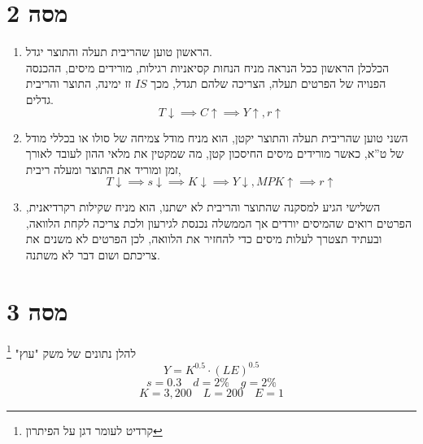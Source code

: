 \documentclass[12pt]{article}
\begin{document}
\section*{מסה 2}
\begin{enumerate}
    \item הראשון טוען שהריבית תעלה והתוצר יגדל. \\
    הכלכלן הראשון ככל הנראה מניח הנחות קסיאניות רגילות, מורידים מיסים, ההכנסה הפנויה של הפרטים תעלה, הצריכה שלהם תגדל, מכך $IS$ זז ימינה, התוצר והריבית גדלים. \begin{equation*}
        T \downarrow \implies C \uparrow \implies Y \uparrow, r \uparrow
    \end{equation*}
    \item השני טוען שהריבית תעלה והתוצר יקטן, הוא מניח מודל צמיחה של סולו או בכללי מודל של ט''א, כאשר מורידים מיסים החיסכון קטן, מה שמקטין את מלאי ההון לעובד לאורך זמן  ומוריד את התוצר ומעלה ריבית,
    \begin{equation*}
        T \downarrow \implies s \downarrow \implies K \downarrow \implies Y \downarrow, MPK \uparrow \implies r \uparrow
    \end{equation*}
    \item השלישי הגיע למסקנה שהתוצר והריבית לא ישתנו, הוא מניח שקילות רקרדיאנית, הפרטים רואים שהמיסים יורדים אך הממשלה נכנסת לגירעון ולכת צריכה לקחת הלוואה, ובעתיד תצטרך לעלות מיסים כדי להחזיר את הלוואה, לכן הפרטים לא משנים את צריכתם ושום דבר לא משתנה.
\end{enumerate}
\newpage
\section*{מסה 3}
להלן נתונים של משק "עוץ" \footnote{קרדיט לעומר דגן על הפיתרון}
$$Y = K^{0.5}  \cdot \left(LE\right)^{0.5}$$
$$s=0.3 \quad d = 2\% \quad g = 2\%$$
$$K = 3,200 \quad L = 200 \quad E = 1$$
\end{document}
